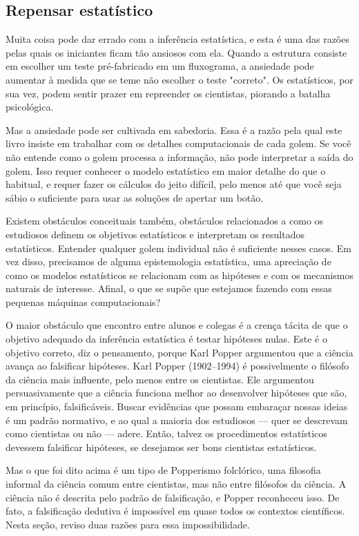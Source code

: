 \subsection{Repensar estatístico}

Muita coisa pode dar errado com a inferência estatística, e esta é uma das razões pelas quais os iniciantes ficam tão ansiosos com ela. Quando a estrutura consiste em escolher um teste pré-fabricado em um fluxograma, a ansiedade pode aumentar à medida que se teme não escolher o teste "correto". Os estatísticos, por sua vez, podem sentir prazer em repreender os cientistas, piorando a batalha psicológica.

Mas a ansiedade pode ser cultivada em sabedoria. Essa é a razão pela qual este livro insiste em trabalhar com os detalhes computacionais de cada golem. Se você não entende como o golem processa a informação, não pode interpretar a saída do golem. Isso requer conhecer o modelo estatístico em maior detalhe do que o habitual, e requer fazer os cálculos do jeito difícil, pelo menos até que você seja sábio o suficiente para usar as soluções de apertar um botão.

Existem obstáculos conceituais também, obstáculos relacionados a como os estudiosos definem os objetivos estatísticos e interpretam os resultados estatísticos. Entender qualquer golem individual não é suficiente nesses casos. Em vez disso, precisamos de alguma epistemologia estatística, uma apreciação de como os modelos estatísticos se relacionam com as hipóteses e com os mecanismos naturais de interesse. Afinal, o que se supõe que estejamos fazendo com essas pequenas máquinas computacionais?

O maior obstáculo que encontro entre alunos e colegas é a crença tácita de que o objetivo adequado da inferência estatística é testar hipóteses nulas. Este é o objetivo correto, diz o pensamento, porque Karl Popper argumentou que a ciência avança ao falsificar hipóteses. Karl Popper (1902–1994) é possivelmente o filósofo da ciência mais influente, pelo menos entre os cientistas. Ele argumentou persuasivamente que a ciência funciona melhor ao desenvolver hipóteses que são, em princípio, falsificáveis. Buscar evidências que possam embaraçar nossas ideias é um padrão normativo, e ao qual a maioria dos estudiosos — quer se descrevam como cientistas ou não — adere. Então, talvez os procedimentos estatísticos devessem falsificar hipóteses, se desejamos ser bons cientistas estatísticos.

Mas o que foi dito acima é um tipo de Popperismo folclórico, uma filosofia informal da ciência comum entre cientistas, mas não entre filósofos da ciência. A ciência não é descrita pelo padrão de falsificação, e Popper reconheceu isso. De fato, a falsificação dedutiva é impossível em quase todos os contextos científicos. Nesta seção, reviso duas razões para essa impossibilidade.

